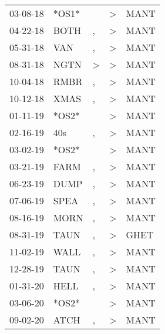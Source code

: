 \begin{supertabular}{lllll}
 03-08-18 &  *OS1* &               &  \textgreater &  MANT \\
 04-22-18 &   BOTH &             , &  \textgreater &  MANT \\
 05-31-18 &    VAN &             , &  \textgreater &  MANT \\
 08-31-18 &   NGTN &  \textgreater &  \textgreater &  MANT \\
 10-04-18 &   RMBR &             , &  \textgreater &  MANT \\
 10-12-18 &   XMAS &             , &  \textgreater &  MANT \\
 01-11-19 &  *OS2* &               &  \textgreater &  MANT \\
 02-16-19 &    40s &             , &  \textgreater &  MANT \\
 03-02-19 &  *OS2* &               &  \textgreater &  MANT \\
 03-21-19 &   FARM &             , &  \textgreater &  MANT \\
 06-23-19 &   DUMP &             , &  \textgreater &  MANT \\
 07-06-19 &   SPEA &             , &  \textgreater &  MANT \\
 08-16-19 &   MORN &             , &  \textgreater &  MANT \\
 08-31-19 &   TAUN &             , &  \textgreater &  GHET \\
 11-02-19 &   WALL &             , &  \textgreater &  MANT \\
 12-28-19 &   TAUN &             , &  \textgreater &  MANT \\
 01-31-20 &   HELL &             , &  \textgreater &  MANT \\
 03-06-20 &  *OS2* &               &  \textgreater &  MANT \\
 09-02-20 &   ATCH &             , &  \textgreater &  MANT \\
\end{supertabular}
